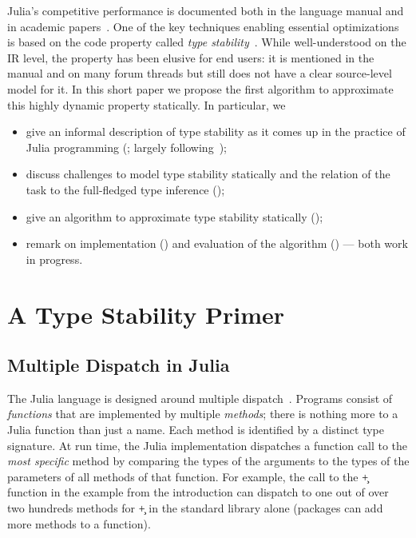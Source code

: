 \documentclass[sigplan,screen]{acmart}
\begin{document}
Julia's competitive performance is documented both in the language manual and in
academic papers~\cite{oopsla18a}. One of the key techniques enabling
essential optimizations is based on the code property called \emph{type
stability}~\cite{Pelenitsyn21}. While well-understood on the IR level, the
property has been elusive for end users: it is mentioned in the manual and on
many forum threads but still does not have a clear source-level model for it.
In this short paper we propose the first algorithm to approximate this highly
dynamic property statically. In particular, we
\begin{itemize}

  \item give an informal description of type stability as it comes up in
  the practice of Julia programming (; largely following~\cite{Pelenitsyn21});

  \item discuss challenges to model type stability statically and the relation
  of the task to the full-fledged type inference ();

  \item give an algorithm to approximate type stability statically ();

  \item remark on implementation () and
  evaluation of the algorithm () --- both work in progress.
\end{itemize}

\section{A Type Stability Primer}%
\label{sec:back}

\subsection{Multiple Dispatch in Julia}%

The Julia language is designed around multiple dispatch~\cite{BezansonEKS17}.
Programs consist of \emph{functions} that are implemented by multiple
\emph{methods}; there is nothing more to a Julia function than just a name. Each
method is identified by a distinct type signature. At run time, the Julia
implementation dispatches a function call to the \emph{most specific} method by
comparing the types of the arguments to the types of the parameters of all
methods of that function. For example, the call to the \c{+} function in the
example from the introduction can dispatch to one out of over two hundreds
methods for \c{+} in the standard library alone (packages can add more methods
to a function). %
\end{document}
